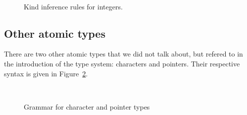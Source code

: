 \begin{figure}[htb]
  \centering

  \begin{prooftree}
  \end{prooftree}
  \hspace{3em}
  \begin{prooftree}
  \end{prooftree}
  \hspace{3em}
  \begin{prooftree}
  \end{prooftree}
  \hspace{3em}
  \begin{prooftree}
  \end{prooftree}
  \\\vspace{\baselineskip}
  \begin{prooftree}
  \end{prooftree}
  \hspace{3em}
  \begin{prooftree}
  \end{prooftree}
  \hspace{3em}
  \begin{prooftree}
  \end{prooftree}
  \hspace{3em}
  \begin{prooftree}
  \end{prooftree}

  \caption{Kind inference rules for integers.}
  \label{fig:nstar-common-ts-integer-kindrules}
\end{figure}

\subsection{Other atomic types}\label{subsec:nstar-common-ts-otheratomic}

There are two other atomic types that we did not talk about, but refered to in the introduction of the type system: characters and pointers. Their respective syntax is given in Figure~\ref{fig:nstar-common-ts-atomic-syntax}.

\begin{figure}[htb]
  \centering
   \\
  \caption{Grammar for character and pointer types}
  \label{fig:nstar-common-ts-atomic-syntax}
\end{figure}

